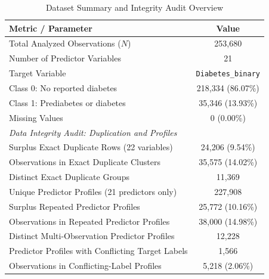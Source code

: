 \begin{table}[htbp]
\centering
\caption{Dataset Summary and Integrity Audit Overview}
\label{tab:data_overview}
\begin{tabular}{lc}
\toprule
\textbf{Metric / Parameter} & \textbf{Value} \\
\midrule
Total Analyzed Observations ($N$) & 253,680 \\
Number of Predictor Variables & 21 \\
Target Variable & \texttt{Diabetes\_binary} \\
Class 0: No reported diabetes & 218,334 (86.07\%) \\
Class 1: Prediabetes or diabetes & 35,346 (13.93\%) \\
Missing Values & 0 (0.00\%) \\
\midrule
\multicolumn{2}{l}{\textit{Data Integrity Audit: Duplication and Profiles}} \\
Surplus Exact Duplicate Rows (22 variables) & 24,206 (9.54\%) \\
Observations in Exact Duplicate Clusters & 35,575 (14.02\%) \\
Distinct Exact Duplicate Groups & 11,369 \\
Unique Predictor Profiles (21 predictors only) & 227,908 \\
Surplus Repeated Predictor Profiles & 25,772 (10.16\%) \\
Observations in Repeated Predictor Profiles & 38,000 (14.98\%) \\
Distinct Multi-Observation Predictor Profiles & 12,228 \\
Predictor Profiles with Conflicting Target Labels & 1,566 \\
Observations in Conflicting-Label Profiles & 5,218 (2.06\%) \\
\bottomrule
\end{tabular}
\end{table}
